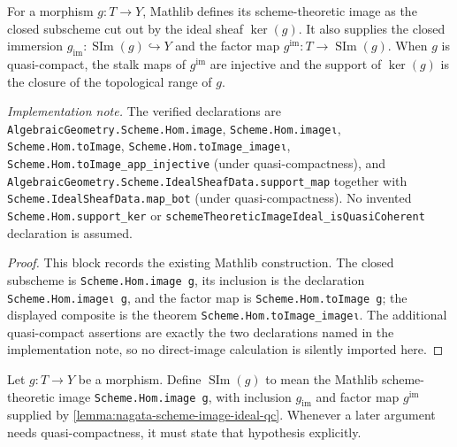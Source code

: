 \begin{lemma}
  \label{lemma:nagata-scheme-image-ideal-qc}

  For a morphism $g\colon T\to Y$, Mathlib defines its scheme-theoretic image
  as the closed subscheme cut out by the ideal sheaf $\operatorname{ker}(g)$.
  It also supplies the closed immersion
  $g_{\mathrm{im}}\colon\operatorname{SIm}(g)\hookrightarrow Y$ and the
  factor map $g^{\mathrm{im}}\colon T\to\operatorname{SIm}(g)$.
  When $g$ is quasi-compact, the stalk maps of $g^{\mathrm{im}}$ are
  injective and the support of $\operatorname{ker}(g)$ is the closure of the
  topological range of $g$.

  \emph{Implementation note.}  The verified declarations are
  \texttt{AlgebraicGeometry.Scheme.Hom.image}, \texttt{Scheme.Hom.imageι},
  \texttt{Scheme.Hom.toImage}, \texttt{Scheme.Hom.toImage_imageι},
  \texttt{Scheme.Hom.toImage\_app\_injective} (under quasi-compactness), and
  \texttt{AlgebraicGeometry.Scheme.IdealSheafData.support\_map} together with
  \texttt{Scheme.IdealSheafData.map\_bot} (under quasi-compactness).  No
  invented \texttt{Scheme.Hom.support\_ker} or
  \texttt{schemeTheoreticImageIdeal\_isQuasiCoherent} declaration is assumed.
\end{lemma}

\begin{proof}
  This block records the existing Mathlib construction.  The closed
  subscheme is \texttt{Scheme.Hom.image g}, its inclusion is the declaration
  \texttt{Scheme.Hom.imageι g}, and the factor map is
  \texttt{Scheme.Hom.toImage g}; the displayed composite is the theorem
  \texttt{Scheme.Hom.toImage_imageι}.  The additional quasi-compact
  assertions are exactly the two declarations named in the implementation
  note, so no direct-image calculation is silently imported here.
\end{proof}

\begin{definition}
  \label{def:nagata-scheme-theoretic-image}

  Let $g\colon T\to Y$ be a morphism.  Define
  $\operatorname{SIm}(g)$ to mean the Mathlib scheme-theoretic image
  \texttt{Scheme.Hom.image g}, with inclusion $g_{\mathrm{im}}$ and factor map
  $g^{\mathrm{im}}$ supplied by
  \ref{lemma:nagata-scheme-image-ideal-qc}.  Whenever a later argument needs
  quasi-compactness, it must state that hypothesis explicitly.
\end{definition}

